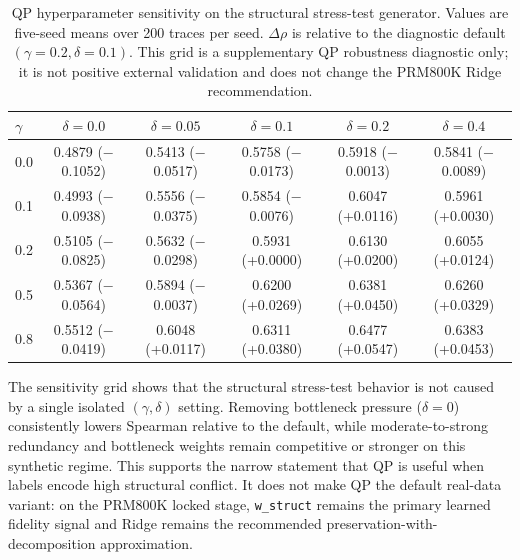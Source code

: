 \documentclass[a4paper,fleqn]{cas-sc}
\begin{document}
\begin{table}[ht]
\caption{QP hyperparameter sensitivity on the structural stress-test generator. Values are five-seed means over 200 traces per seed. $\Delta\rho$ is relative to the diagnostic default $(\gamma=0.2,\delta=0.1)$. This grid is a supplementary QP robustness diagnostic only; it is not positive external validation and does not change the PRM800K Ridge recommendation.}
\label{tab:supp-gamma-delta-sensitivity}
\centering
\small
\begin{tabular}{lccccc}
\toprule
\textbf{$\gamma$} & \textbf{$\delta=0.0$} & \textbf{$\delta=0.05$} & \textbf{$\delta=0.1$} & \textbf{$\delta=0.2$} & \textbf{$\delta=0.4$} \\
\midrule
0.0 & 0.4879 ($-$0.1052) & 0.5413 ($-$0.0517) & 0.5758 ($-$0.0173) & 0.5918 ($-$0.0013) & 0.5841 ($-$0.0089) \\
0.1 & 0.4993 ($-$0.0938) & 0.5556 ($-$0.0375) & 0.5854 ($-$0.0076) & 0.6047 (+0.0116) & 0.5961 (+0.0030) \\
0.2 & 0.5105 ($-$0.0825) & 0.5632 ($-$0.0298) & 0.5931 (+0.0000) & 0.6130 (+0.0200) & 0.6055 (+0.0124) \\
0.5 & 0.5367 ($-$0.0564) & 0.5894 ($-$0.0037) & 0.6200 (+0.0269) & 0.6381 (+0.0450) & 0.6260 (+0.0329) \\
0.8 & 0.5512 ($-$0.0419) & 0.6048 (+0.0117) & 0.6311 (+0.0380) & 0.6477 (+0.0547) & 0.6383 (+0.0453) \\
\bottomrule
\end{tabular}
\end{table}

The sensitivity grid shows that the structural stress-test behavior is not caused by a single isolated $(\gamma,\delta)$ setting. Removing bottleneck pressure ($\delta=0$) consistently lowers Spearman relative to the default, while moderate-to-strong redundancy and bottleneck weights remain competitive or stronger on this synthetic regime. This supports the narrow statement that QP is useful when labels encode high structural conflict. It does not make QP the default real-data variant: on the PRM800K locked stage, \texttt{w\_struct} remains the primary learned fidelity signal and Ridge remains the recommended preservation-with-decomposition approximation.
\end{document}
